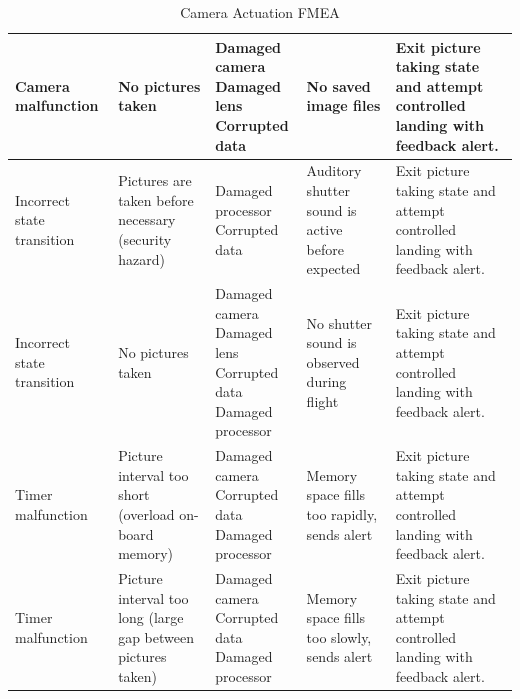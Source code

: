 \documentclass[10pt,letterpaper]{article}
\begin{document}
\begin{table}[H]
\begin{adjustwidth}{-1.8in}{-1.8in}
\begin{center}
\begin{tabular}{|p{3cm}p{3cm}p{3cm}p{3cm}p{3cm}|}
              Camera malfunction & 
              No pictures taken & 
              \parbox[t]{3cm}{Damaged camera \\ Damaged lens \\ Corrupted data} & 
              No saved image files & 
              Exit picture taking state and attempt controlled landing with feedback alert. \\ \hline  
              
              Incorrect state transition & 
              Pictures are taken before necessary (security hazard) & 
              \parbox[t]{3cm}{Damaged processor \\ Corrupted data} &
              Auditory shutter sound is active before expected & 
              Exit picture taking state and attempt controlled landing with feedback alert. \\ \hline  
              
              Incorrect state transition & 
              No pictures taken & 
              \parbox[t]{3cm}{Damaged camera \\ Damaged lens \\ Corrupted data \\ Damaged processor} & 
              No shutter sound is observed during flight & 
              Exit picture taking state and attempt controlled landing with feedback alert. \\ \hline  
              
              Timer malfunction & 
              Picture interval too short (overload on-board memory) & 
              \parbox[t]{3cm}{Damaged camera \\ Corrupted data \\ Damaged processor} & 
              Memory space fills too rapidly, sends alert & 
              Exit picture taking state and attempt controlled landing with feedback alert. \\ \hline  
              
              Timer malfunction & 
              Picture interval too long (large gap between pictures taken) & 
              \parbox[t]{3cm}{Damaged camera \\ Corrupted data \\ Damaged processor} &
              Memory space fills too slowly, sends alert & 
              Exit picture taking state and attempt controlled landing with feedback alert. \\ \hline  
              
              
          \end{tabular}
      \end{center}
      \caption[Camera Actuation FMEA]{Camera Actuation FMEA}
    \end{adjustwidth}
\end{table}
\end{document}

